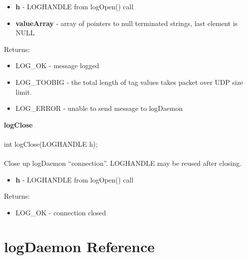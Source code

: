 \documentclass[11pt]{article}
\begin{document}
\begin{itemize}
  \item {\bf h} - LOGHANDLE from logOpen() call
  \item {\bf valueArray} - array of pointers to null terminated strings, last element is NULL
\end{itemize}
Returns:

\begin{itemize}
  \item LOG\_OK - message logged
  \item LOG\_TOOBIG - the total length of tag values takes packet over UDP size limit.
  \item LOG\_ERROR - unable to send message to logDaemon
\end{itemize}
{\bf logClose}\\
\\
int logClose(LOGHANDLE h);\\
\\
Close up logDaemon ``connection''. LOGHANDLE may be reused after closing.

\begin{itemize}
  \item {\bf h} - LOGHANDLE from logOpen() call
\end{itemize}
Returns:

\begin{itemize}
  \item LOG\_OK - connection closed
\end{itemize}
\section{logDaemon Reference}
\end{document}
